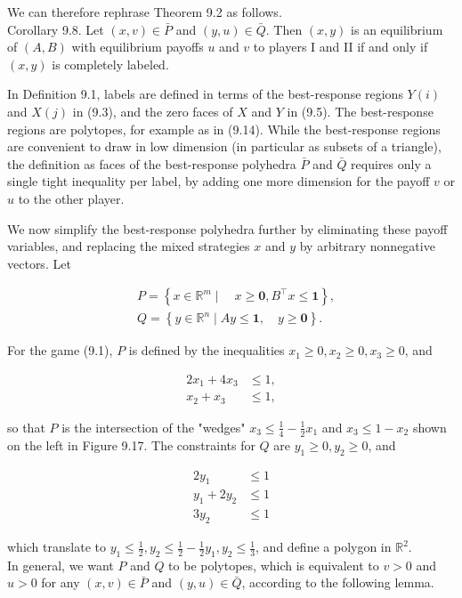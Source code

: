 \documentclass[12pt]{article}
\begin{document}
We can therefore rephrase Theorem 9.2 as follows.\\
Corollary 9.8. Let $(x, v) \in \bar{P}$ and $(y, u) \in \bar{Q}$. Then $(x, y)$ is an equilibrium of $(A, B)$ with equilibrium payoffs $u$ and $v$ to players I and II if and only if $(x, y)$ is completely labeled.

In Definition 9.1, labels are defined in terms of the best-response regions $Y(i)$ and $X(j)$ in (9.3), and the zero faces of $X$ and $Y$ in (9.5). The best-response regions are polytopes, for example as in (9.14). While the best-response regions are convenient to draw in low dimension (in particular as subsets of a triangle), the definition as faces of the best-response polyhedra $\bar{P}$ and $\bar{Q}$ requires only a single tight inequality per label, by adding one more dimension for the payoff $v$ or $u$ to the other player.

We now simplify the best-response polyhedra further by eliminating these payoff variables, and replacing the mixed strategies $x$ and $y$ by arbitrary nonnegative vectors. Let


\begin{align*}
& P=\left\{x \in \mathbb{R}^{m} \mid \quad x \geq \mathbf{0}, B^{\top} x \leq \mathbf{1}\right\},  \tag{9.24}\\
& Q=\left\{y \in \mathbb{R}^{n} \mid A y \leq \mathbf{1}, \quad y \geq \mathbf{0}\right\} .
\end{align*}


For the game (9.1), $P$ is defined by the inequalities $x_{1} \geq 0, x_{2} \geq 0, x_{3} \geq 0$, and

$$
\begin{aligned}
2 x_{1}+4 x_{3} & \leq 1, \\
x_{2}+x_{3} & \leq 1,
\end{aligned}
$$

so that $P$ is the intersection of the "wedges" $x_{3} \leq \frac{1}{4}-\frac{1}{2} x_{1}$ and $x_{3} \leq 1-x_{2}$ shown on the left in Figure 9.17. The constraints for $Q$ are $y_{1} \geq 0, y_{2} \geq 0$, and


\begin{align*}
2 y_{1} & \leq 1 \\
y_{1}+2 y_{2} & \leq 1  \tag{9.25}\\
3 y_{2} & \leq 1
\end{align*}


which translate to $y_{1} \leq \frac{1}{2}, y_{2} \leq \frac{1}{2}-\frac{1}{2} y_{1}, y_{2} \leq \frac{1}{3}$, and define a polygon in $\mathbb{R}^{2}$.\\
In general, we want $P$ and $Q$ to be polytopes, which is equivalent to $v>0$ and $u>0$ for any $(x, v) \in \bar{P}$ and $(y, u) \in \bar{Q}$, according to the following lemma.
\end{document}
